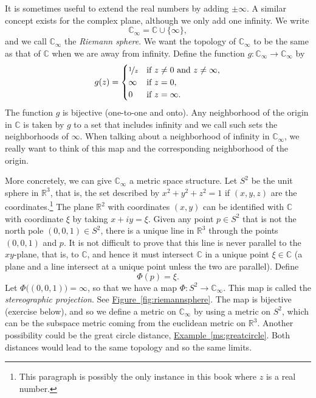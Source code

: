 \documentclass[12pt,openany]{book}
\newcommand{\glsadd}[2][]{}
\newcommand{\C}{{\mathbb{C}}}
\newcommand{\R}{{\mathbb{R}}}
\newcommand{\myindex}[1]{#1\index{#1}}
\theoremstyle{plain}
\theoremstyle{remark}
\theoremstyle{definition}
\theoremstyle{exercise}
\theoremstyle{example}
\newcommand{\figureref}[1]{\hyperref[#1]{Figure~\ref*{#1}}}
\newcommand{\exampleref}[1]{\hyperref[#1]{Example~\ref*{#1}}}
\begin{document}
It is sometimes useful to extend the real numbers by adding $\pm \infty$.
A similar concept exists for the complex plane, although
we only add one infinity.  We write
\glsadd{not:Cinfty}%
\glsadd{not:infty}%
\begin{equation*}
\C_{\infty} = \C \cup \{ \infty \} ,
\end{equation*}
and we call $\C_{\infty}$ the \emph{\myindex{Riemann sphere}}.
We want the topology of $\C_\infty$ to be the same as that of $\C$
when we are away from infinity.
Define the function $g \colon \C_\infty \to \C_\infty$ by
\begin{equation*}
g(z) =
\begin{cases}
\nicefrac{1}{z} & \text{if } z \neq 0 \text{ and } z \neq \infty, \\
\infty & \text{if } z = 0, \\
0 & \text{if } z = \infty.
\end{cases}
\end{equation*}
The function $g$ is bijective (one-to-one and onto).
Any neighborhood of the origin in $\C$ is taken by $g$ to a set that
includes infinity and we call such sets the neighborhoods of
$\infty$.  When talking about a neighborhood of
infinity in $\C_{\infty}$, we really want to think of this map
and the corresponding neighborhood of the origin.

More concretely, we can give $\C_{\infty}$ a metric space structure.
Let $S^2$ be the unit sphere in $\R^3$,
that is, the set described by $x^2 + y^2 + z^2 = 1$ if $(x,y,z)$ are the
coordinates.\footnote{This paragraph is possibly the only instance in this book where
$z$ is a real number.}  The plane $\R^2$ with coordinates $(x,y)$ can be
identified with $\C$ with coordinate $\xi$ by taking $x+iy = \xi$.
Given any point $p \in S^2$ that is not the north pole $(0,0,1) \in S^2$,
there is a unique line in $\R^3$ through the points $(0,0,1)$ and $p$.
It is not difficult to prove that this line is never parallel to the
$xy$-plane, that is, to $\C$, and hence it must intersect $\C$ in a unique
point $\xi \in \C$ (a plane and a line intersect at a unique point unless
the two are parallel).  Define
\begin{equation*}
\Phi(p) = \xi.
\end{equation*}
Let $\Phi\bigl((0,0,1)\bigr) = \infty$, so that we have a map
$\Phi \colon S^2 \to \C_\infty$.  This map is called the 
\emph{\myindex{stereographic projection}}.  See
\figureref{fig:riemannsphere}.
The map is bijective (exercise below),
and so we define a metric on $\C_\infty$ by
using a metric on $S^2$, which can be the subspace
metric coming from the euclidean metric on $\R^3$.
Another possibility
could be the great circle distance, \exampleref{ms:greatcircle}.
Both distances would lead to the same topology and so the same limits.
\end{document}
